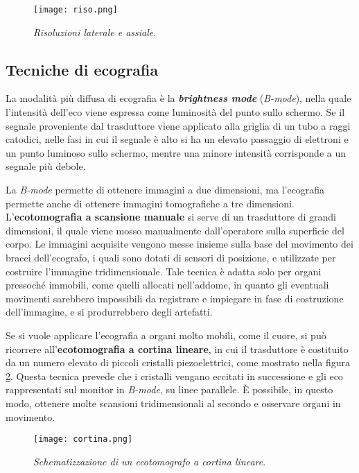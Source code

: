 \documentclass{report}
\newcommand{\figref}[1]{figura \ref{#1}}
\numberwithin{equation}{section}
\numberwithin{figure}{section}
\begin{document}
\begin{figure}[htp]
\centering
\texttt{[image: riso.png]}
\caption{\label{fig:riso} \textit{Risoluzioni laterale e assiale}.}
\end{figure}

\subsection{Tecniche di ecografia}
La modalità più diffusa di ecografia è la \textbf{\textit{brightness mode}} (\textit{B-mode}), nella quale l'intensità dell'eco viene espressa come luminosità del punto sullo schermo. Se il segnale proveniente dal trasduttore viene applicato alla griglia di un tubo a raggi catodici, nelle fasi in cui il segnale è alto si ha un elevato passaggio di elettroni e un punto luminoso sullo schermo, mentre una minore intensità corrisponde a un segnale più debole.

La \textit{B-mode} permette di ottenere immagini a due dimensioni, ma l'ecografia permette anche di ottenere immagini tomografiche a tre dimensioni. L'\textbf{ecotomografia a scansione manuale} si serve di un trasduttore di grandi dimensioni, il quale viene mosso manualmente dall'operatore sulla superficie del corpo. Le immagini acquisite vengono messe insieme sulla base del movimento dei bracci dell'ecografo, i quali sono dotati di sensori di posizione, e utilizzate per costruire l'immagine tridimensionale. Tale tecnica è adatta solo per organi pressoché immobili, come quelli allocati nell'addome, in quanto gli eventuali movimenti sarebbero impossibili da registrare e impiegare in fase di costruzione dell'immagine, e si produrrebbero degli artefatti.

Se si vuole applicare l'ecografia a organi molto mobili, come il cuore, si può ricorrere all'\textbf{ecotomografia a cortina lineare}, in cui il trasduttore è costituito da un numero elevato di piccoli cristalli piezoelettrici, come mostrato nella \figref{fig:cortina}. Questa tecnica prevede che i cristalli vengano eccitati in successione e gli eco rappresentati sul monitor in \textit{B-mode}, su linee parallele. È possibile, in questo modo, ottenere molte scansioni tridimensionali al secondo e osservare organi in movimento.

\begin{figure}[htp]
\centering
\texttt{[image: cortina.png]}
\caption{\label{fig:cortina} \textit{Schematizzazione di un ecotomografo a cortina lineare}.}
\end{figure}
\end{document}
